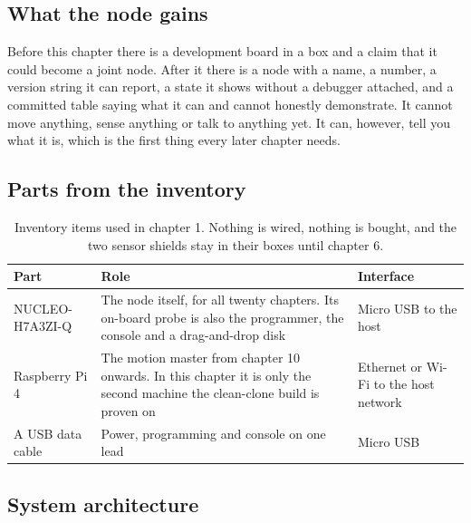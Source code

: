 \subsection*{What the node gains}

Before this chapter there is a development board in a box and a claim that it
could become a joint node. After it there is a node with a name, a number, a
version string it can report, a state it shows without a debugger attached, and
a committed table saying what it can and cannot honestly demonstrate. It cannot
move anything, sense anything or talk to anything yet. It can, however, tell you
what it is, which is the first thing every later chapter needs.


\subsection*{Parts from the inventory}

\begin{table}[H]\centering\small
\begin{tabular}{p{40mm}p{66mm}p{40mm}}
\toprule
Part & Role & Interface \\
\midrule
NUCLEO-H7A3ZI-Q & The node itself, for all twenty chapters. Its on-board probe is also the programmer, the console and a drag-and-drop disk & Micro USB to the host \\
Raspberry Pi 4 & The motion master from chapter 10 onwards. In this chapter it is only the second machine the clean-clone build is proven on & Ethernet or Wi-Fi to the host network \\
A USB data cable & Power, programming and console on one lead & Micro USB \\
\bottomrule
\end{tabular}
\caption{Inventory items used in chapter 1. Nothing is wired, nothing is bought, and the two sensor shields stay in their boxes until chapter 6.}
\end{table}

\subsection*{System architecture}

